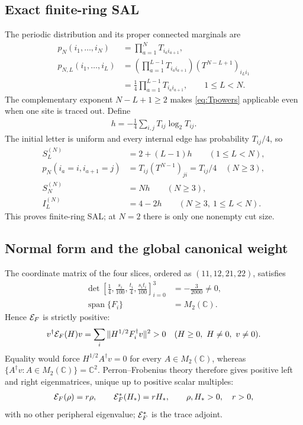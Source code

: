 \documentclass[aps,pra,reprint,nofootinbib,onecolumn]{revtex4-2}
\begin{document}
\subsection{Exact finite-ring SAL}

The periodic distribution and its proper connected marginals are
\begin{align}
	p_N(i_1,\ldots,i_N) & =\prod_{a=1}^NT_{i_ai_{a+1}},\nonumber       \\
	p_{N,L}(i_1,\ldots,i_L)
	                    & =\left(\prod_{a=1}^{L-1}T_{i_ai_{a+1}}\right)
	                       (T^{N-L+1})_{i_Li_1}\nonumber \\
	                    & =\frac14\prod_{a=1}^{L-1}T_{i_ai_{a+1}},
	\qquad 1\leq L<N.
	\label{eq:marginal}
\end{align}
The complementary exponent $N-L+1\geq2$ makes
\cref{eq:Tpowers} applicable even when one site is traced out.
Define
\begin{align}
	h=-\frac14\sum_{i,j}T_{ij}\log_2T_{ij}.
	\label{eq:h-entropy}
\end{align}
The initial letter is uniform and every internal edge has
probability $T_{ij}/4$, so
\begin{align}
	S_L^{(N)} & =2+(L-1)h\qquad(1\leq L<N),\nonumber                  \\
	p_N(i_a=i,i_{a+1}=j)
	          & =T_{ij}(T^{N-1})_{ji}=T_{ij}/4\quad(N\geq3),\nonumber \\
	S_N^{(N)} & =Nh\qquad(N\geq3),\nonumber                           \\
	I_L^{(N)} & =4-2h\qquad(N\geq3,\ 1\leq L<N).
	\label{eq:SL-IL}
\end{align}
This proves finite-ring SAL; at $N=2$ there is only one
nonempty cut size.

\subsection{Normal form and the global canonical weight}

The coordinate matrix of the four slices, ordered as
$(11,12,21,22)$, satisfies
\begin{align}
	\det\left[\frac14,\frac{s_i}{100},\frac{t_i}{4},\frac{s_it_i}{100}\right]_{i=0}^3 & =-\frac3{2000}\ne0,\nonumber \\
	\operatorname{span}\{F_i\}                                                        & =M_2(\mathbb C).
	\label{eq:span-M2-det}
\end{align}
Hence $\mathcal{E}_F$ is strictly positive:
\begin{align}
	v^\dagger\mathcal{E}_F(H)v
	=\sum_i\|H^{1/2}F_i^\dagger v\|^2>0
	\quad(H\geq0,\ H\ne0,\ v\ne0).
	\label{eq:EF-strictly-positive}
\end{align}
Equality would force $H^{1/2}A^\dagger v=0$ for every
$A\in M_2(\mathbb C)$, whereas
$\{A^\dagger v:A\in M_2(\mathbb C)\}=\mathbb C^2$.
Perron--Frobenius theory therefore gives positive left and right
eigenmatrices, unique up to positive scalar multiples:
\begin{align}
	\mathcal{E}_F(\rho)=r\rho,\qquad
	\mathcal{E}_F^*(H_*)=rH_*,
	\qquad \rho,H_*>0,\quad r>0,
	\label{eq:perron-evals}
\end{align}
with no other peripheral eigenvalue; $\mathcal{E}_F^*$ is the trace adjoint.
\end{document}
